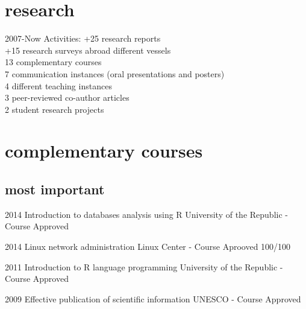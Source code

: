 \documentclass[]{friggeri-cv} %
\begin{document}
\section{research}
\begin{entrylist}
\entry 
{2007-Now}
{Activities:}
{}
{+25 research reports\\
	+15 research surveys abroad different vessels\\
	13 complementary courses\\
	7 communication instances (oral presentations and posters)\\
	4 different teaching instances\\
	3 peer-reviewed co-author articles\\
	2 student research projects
	}
\end{entrylist}


\section{complementary courses}

\subsection{most important}

\begin{entrylist}

	\entry
	{2014}	
	{Introduction to databases analysis using R}
	{University of the Republic - Course}
	{Approved}

	\entry
	{2014}	
	{Linux network administration}
	{Linux Center - Course}
	{Aprooved 100/100}
	
	\entry
	{2011}	
	{Introduction to R language programming}
	{University of the Republic - Course}
	{Approved}
	
	\entry
	{2009}	
	{Effective publication of scientific information}
	{UNESCO - Course}
	{Approved}

\end{entrylist}
\end{document}
